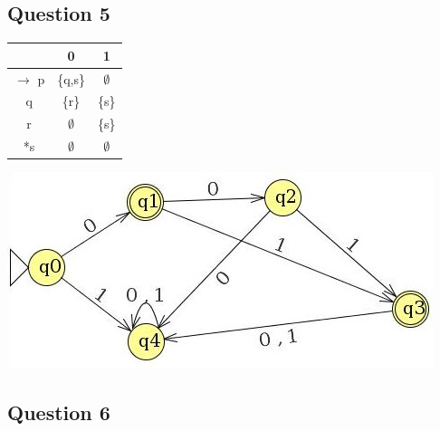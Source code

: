 \documentclass[12pt,a4paper]{article}
\begin{document}
	\subsection*{Question 5}	
		\begin{table}[h]
			\centering
			\begin{tabular}{|c|c|c|}
				\hline
				 & 0 & 1 \\
				\hline
				$\rightarrow$ p & \{q,s\} & $\emptyset$\\
				q & \{r\} & \{s\}\\
				r & $\emptyset$ & \{s\}\\
				*s & $\emptyset$ & $\emptyset$\\
				\hline
			\end{tabular}
		\end{table}
		
		\begin{center}
			\includegraphics[width=0.7\linewidth]{a1q5}
		\end{center}

	\subsection*{Question 6}
		
\end{document}
